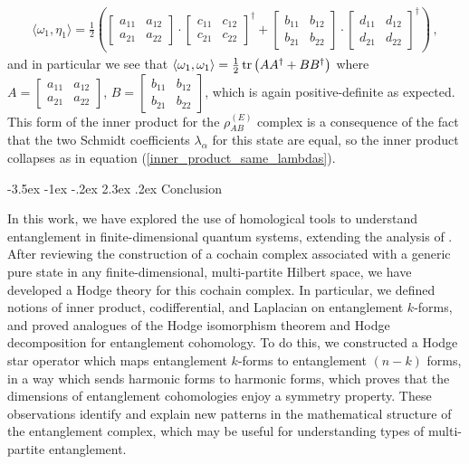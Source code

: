 \documentclass[12pt]{article}
\makeatletter
\renewcommand\section{\@startsection {section}{1}{\z@}%
                                   {-3.5ex \@plus -1ex \@minus -.2ex}%
                                   {2.3ex \@plus.2ex}%
                                   {\normalfont\large\bfseries}}
\numberwithin{equation}{section}
\makeatother
\begin{document}
\begin{align}
    \langle \omega_1 , \eta_1 \rangle = \frac{1}{2} \left( \begin{bmatrix} a_{11} & a_{12} \\ a_{21} & a_{22} \end{bmatrix} \cdot \begin{bmatrix} c_{11} & c_{12} \\ c_{21} & c_{22} \end{bmatrix}^\dagger + \begin{bmatrix} b_{11} & b_{12} \\ b_{21} & b_{22} \end{bmatrix} \cdot \begin{bmatrix} d_{11} & d_{12} \\ d_{21} & d_{22} \end{bmatrix}^\dagger \right) \, ,
\end{align}
%
and in particular we see that $\langle \omega_1, \omega_1 \rangle = \frac{1}{2} \tr \left( A A^\dagger + B B^\dagger \right)$ where $A = \begin{bmatrix} a_{11} & a_{12} \\ a_{21} & a_{22} \end{bmatrix}$, $B = \begin{bmatrix} b_{11} & b_{12} \\ b_{21} & b_{22} \end{bmatrix}$, which is again positive-definite as expected. This form of the inner product for the $\rho_{AB}^{(E)}$ complex is a consequence of the fact that the two Schmidt coefficients $\lambda_\alpha$ for this state are equal, so the inner product collapses as in equation (\ref{inner_product_same_lambdas}).


\section{Conclusion}\label{sec:conclusion}

In this work, we have explored the use of homological tools to understand entanglement in finite-dimensional quantum systems, extending the analysis of \cite{Mainiero:2019enr}. After reviewing the construction of a cochain complex associated with a generic pure state in any finite-dimensional, multi-partite Hilbert space, we have developed a Hodge theory for this cochain complex. In particular, we defined notions of inner product, codifferential, and Laplacian on entanglement $k$-forms, and proved analogues of the Hodge isomorphism theorem and Hodge decomposition for entanglement cohomology. To do this, we constructed a Hodge star operator which maps entanglement $k$-forms to entanglement $(n-k)$ forms, in a way which sends harmonic forms to harmonic forms, which proves that the dimensions of entanglement cohomologies enjoy a symmetry property. These observations identify and explain new patterns in the mathematical structure of the entanglement complex, which may be useful for understanding types of multi-partite entanglement.
\end{document}
